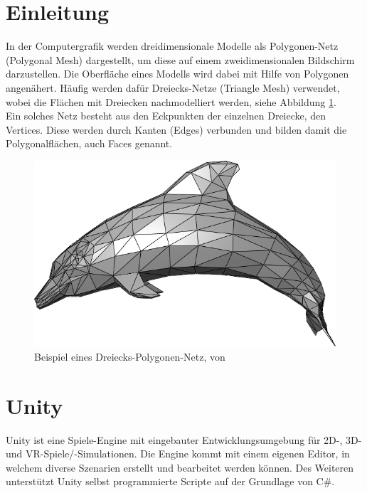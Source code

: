 \section{Einleitung}
In der Computergrafik werden dreidimensionale Modelle als Polygonen-Netz (Polygonal Mesh) dargestellt, um diese auf einem zweidimensionalen Bildschirm darzustellen. Die Oberfl\"ache eines Modells wird dabei mit Hilfe von Polygonen angen\"ahert. H\"aufig werden daf\"ur Dreiecks-Netze (Triangle Mesh) verwendet, wobei die Fl\"achen mit Dreiecken nachmodelliert werden, siehe Abbildung \ref{fig:dolphintrianglemesh}. 
\\Ein solches Netz besteht aus den Eckpunkten der einzelnen Dreiecke, den Vertices. Diese werden durch Kanten (Edges) verbunden und bilden damit die Polygonalfl\"achen, auch Faces genannt. 

\begin{figure}[h]
	\centering
	\includegraphics[width=0.7\linewidth]{Images/Dolphin_triangle_mesh}
	\caption[Beispiel eines Polygonen-Netzes]{Beispiel eines Dreiecks-Polygonen-Netz, von \cite{WikipediaDolphin}}
	\label{fig:dolphintrianglemesh}
\end{figure}

\section{Unity}
Unity ist eine Spiele-Engine mit eingebauter Entwicklungsumgebung f\"ur 2D-, 3D- und VR-Spiele/-Simulationen. Die Engine kommt mit einem eigenen Editor, in welchem diverse Szenarien erstellt und bearbeitet werden k\"onnen. Des Weiteren unterst\"utzt Unity selbst programmierte Scripte auf der Grundlage von C\#.
